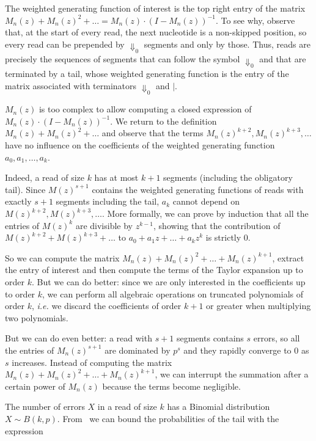 \documentclass{article}
\begin{document}
The weighted generating function of interest is the top right entry of the
matrix $M_n(z) + M_n(z)^2 + \ldots = M_n(z)\cdot(I-M_n(z))^{-1}$. To see
why, observe that, at the start of every read, the next nucleotide is a
non-skipped position, so every read can be prepended by $\Downarrow_0$
segments and only by those. Thus, reads are precisely the sequences of
segments that can follow the symbol $\Downarrow_0$ and that are terminated
by a tail, whose weighted generating function is the entry of the matrix
associated with terminators $\Downarrow_0$ and $|$.

$M_n(z)$ is too complex to allow computing a closed expression of $M_n(z) \cdot
(I-M_n(z))^{-1}$. We return to the definition $M_n(z) + M_n(z)^2 + \ldots$ and
observe that the terms $M_n(z)^{k+2}, M_n(z)^{k+3}, \ldots$ have no influence on
the coefficients of the weighted generating function $a_0, a_1, \ldots, a_k$.

Indeed, a read of size $k$ has at most $k+1$ segments (including the obligatory
tail). Since $M(z)^{s+1}$ contains the weighted generating functions of reads
with exactly $s+1$ segments including the tail, $a_k$ cannot depend on
$M(z)^{k+2}, M(z)^{k+3}, \ldots$. More formally, we can prove by induction that
all the entries of $M(z)^k$ are divisible by $z^{k-1}$, showing that the
contribution of $M(z)^{k+2} + M(z)^{k+3} + \ldots$ to $a_0 + a_1z + \ldots
+a_kz^k$ is strictly $0$.

So we can compute the matrix $M_n(z) + M_n(z)^2 + \ldots + M_n(z)^{k+1}$,
extract the entry of interest and then compute the terms of the Taylor
expansion up to order $k$. But we can do better: since we are only
interested in the coefficients up to order $k$, we can perform all
algebraic operations on truncated polynomials of order $k$, \textit{i.e.}
we discard the coefficients of order $k+1$ or greater when multiplying two
polynomials.

But we can do even better: a read with $s+1$ segments contains $s$ errors,
so all the entries of $M_n(z)^{s+1}$ are dominated by $p^s$ and they
rapidly converge to $0$ as $s$ increases. Instead of computing the matrix
$M_n(z) + M_n(z)^2 + \ldots + M_n(z)^{k+1}$, we can interrupt the
summation after a certain power of $M_n(z)$ because the terms become
negligible.

The number of errors $X$ in a read of size $k$ has a Binomial
distribution $X \sim B(k,p)$. From~\cite{arratia1989tutorial} we can bound
the probabilities of the tail with the expression
\end{document}
